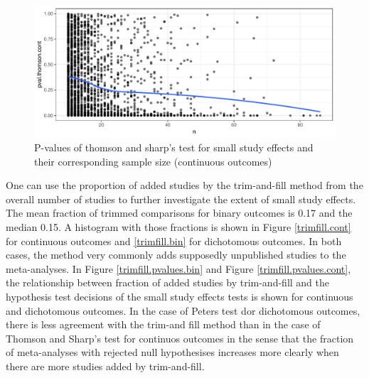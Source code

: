 \documentclass[11pt,a4paper,twoside]{book}\usepackage[]{graphicx}\usepackage[]{color}
\newenvironment{knitrout}{}{} %
\begin{document}
\begin{figure}
\begin{knitrout}
\color{fgcolor}

{\centering \includegraphics[width=\textwidth-3cm]{figure/ch02_figunnamed-chunk-24-1} 

}



\end{knitrout}
\caption{P-values of thomson and sharp's test for small study effects and their corresponding sample size (continuous outcomes)}
\label{pvalues.samplesize.cont}
\end{figure}


\vspace{0mm}
One can use the proportion of added studies by the trim-and-fill method from the overall number of studies to further investigate the extent of small study effects. The mean fraction of trimmed comparisons for binary outcomes is 0.17 and the median 0.15. A histogram with those fractions is shown in Figure \ref{trimfill.cont} for continuous outcomes and \ref{trimfill.bin} for dichotomous outcomes. In both cases, the method very commonly adds supposedly unpublished studies to the meta-analyses. In Figure \ref{trimfill.pvalues.bin} and Figure \ref{trimfill.pvalues.cont}, the relationship between fraction of added studies by trim-and-fill and the hypothesis test decisions of the small study effects tests is shown for continuous and dichotomous outcomes. In the case of Peters test dor dichotomous outcomes, there is less agreement with the trim-and fill method than in the case of Thomson and Sharp's test for continuos outcomes in the sense that the fraction of meta-analyses with rejected null hypothesises increases more clearly when there are more studies added by trim-and-fill.
\end{document}
